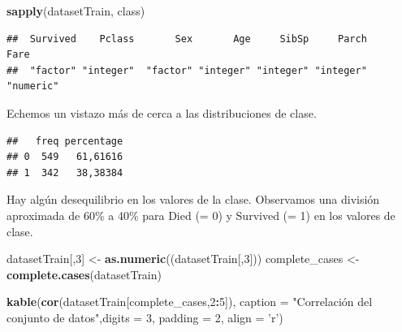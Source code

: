 \documentclass[]{article}
\newenvironment{Shaded}{\begin{snugshade}}{\end{snugshade}}
\newcommand{\KeywordTok}[1]{\textcolor[rgb]{0.13,0.29,0.53}{\textbf{#1}}}
\newcommand{\DataTypeTok}[1]{\textcolor[rgb]{0.13,0.29,0.53}{#1}}
\newcommand{\DecValTok}[1]{\textcolor[rgb]{0.00,0.00,0.81}{#1}}
\newcommand{\StringTok}[1]{\textcolor[rgb]{0.31,0.60,0.02}{#1}}
\newcommand{\CommentTok}[1]{\textcolor[rgb]{0.56,0.35,0.01}{\textit{#1}}}
\newcommand{\OperatorTok}[1]{\textcolor[rgb]{0.81,0.36,0.00}{\textbf{#1}}}
\newcommand{\NormalTok}[1]{#1}
\begin{document}
\begin{Shaded}
\begin{Highlighting}[]
\KeywordTok{sapply}\NormalTok{(datasetTrain, class)}
\end{Highlighting}
\end{Shaded}

\begin{verbatim}
##  Survived    Pclass       Sex       Age     SibSp     Parch      Fare 
##  "factor" "integer"  "factor" "integer" "integer" "integer" "numeric"
\end{verbatim}

Echemos un vistazo más de cerca a las distribuciones de clase.

\begin{Shaded}
\end{Shaded}

\begin{verbatim}
##   freq percentage
## 0  549   61,61616
## 1  342   38,38384
\end{verbatim}

Hay algún desequilibrio en los valores de la clase. Observamos una
división aproximada de 60\% a 40\% para Died (= 0) y Survived (= 1) en
los valores de clase.

\begin{Shaded}
\begin{Highlighting}[]
\NormalTok{datasetTrain[,}\DecValTok{3}\NormalTok{] <-}\StringTok{ }\KeywordTok{as.numeric}\NormalTok{((datasetTrain[,}\DecValTok{3}\NormalTok{]))}
\NormalTok{complete_cases <-}\StringTok{ }\KeywordTok{complete.cases}\NormalTok{(datasetTrain)}

\KeywordTok{kable}\NormalTok{(}\KeywordTok{cor}\NormalTok{(datasetTrain[complete_cases,}\DecValTok{2}\OperatorTok{:}\DecValTok{5}\NormalTok{]), }\DataTypeTok{caption =} \StringTok{"Correlación del conjunto de datos"}\NormalTok{,}\DataTypeTok{digits =} \DecValTok{3}\NormalTok{, }\DataTypeTok{padding =} \DecValTok{2}\NormalTok{, }\DataTypeTok{align =} \StringTok{'r'}\NormalTok{)}
\end{Highlighting}
\end{Shaded}
\end{document}
